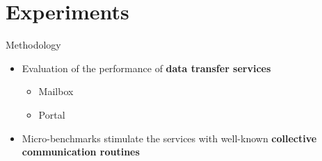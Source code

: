 \section{Experiments}

	\begin{frame}[fragile]{Methodology}
		\begin{itemize}
			\item Evaluation of the performance of \textbf{data transfer services}
			\begin{itemize}
				\item Mailbox
				\item Portal
			\end{itemize}
			\item Micro-benchmarks stimulate the services with well-known \textbf{collective communication routines}
		\end{itemize}

	\end{frame}

